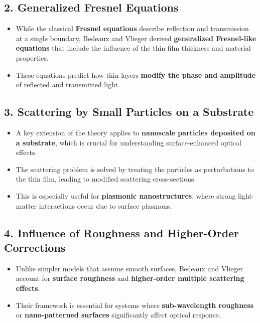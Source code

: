 \documentclass{article}
\begin{document}
		\subsection*{2. Generalized Fresnel Equations}
		\begin{itemize}
			\item While the classical \textbf{Fresnel equations} describe reflection and transmission at a single boundary, Bedeaux and Vlieger derived \textbf{generalized Fresnel-like equations} that include the influence of the thin film thickness and material properties.
			\item These equations predict how thin layers \textbf{modify the phase and amplitude} of reflected and transmitted light.
		\end{itemize}
		
		\subsection*{3. Scattering by Small Particles on a Substrate}
		\begin{itemize}
			\item A key extension of the theory applies to \textbf{nanoscale particles deposited on a substrate}, which is crucial for understanding surface-enhanced optical effects.
			\item The scattering problem is solved by treating the particles as perturbations to the thin film, leading to modified scattering cross-sections.
			\item This is especially useful for \textbf{plasmonic nanostructures}, where strong light-matter interactions occur due to surface plasmons.
		\end{itemize}
		
		\subsection*{4. Influence of Roughness and Higher-Order Corrections}
		\begin{itemize}
			\item Unlike simpler models that assume smooth surfaces, Bedeaux and Vlieger account for \textbf{surface roughness} and \textbf{higher-order multiple scattering effects}.
			\item Their framework is essential for systems where \textbf{sub-wavelength roughness} or \textbf{nano-patterned surfaces} significantly affect optical response.
		\end{itemize}
		
\end{document}
